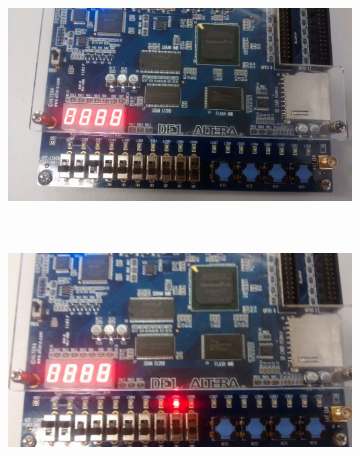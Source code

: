\begin{figure}
	\begin{subfigure}[b]{0.44\textwidth}
        \includegraphics[width=\textwidth]{img/cenario2/circ3}
        \label{fig:circ3}
    \end{subfigure}
    ~
    \begin{subfigure}[b]{0.44\textwidth}
        \includegraphics[width=\textwidth]{img/cenario2/circ4}
        \label{fig:circ4}
    \end{subfigure}



\end{figure}
